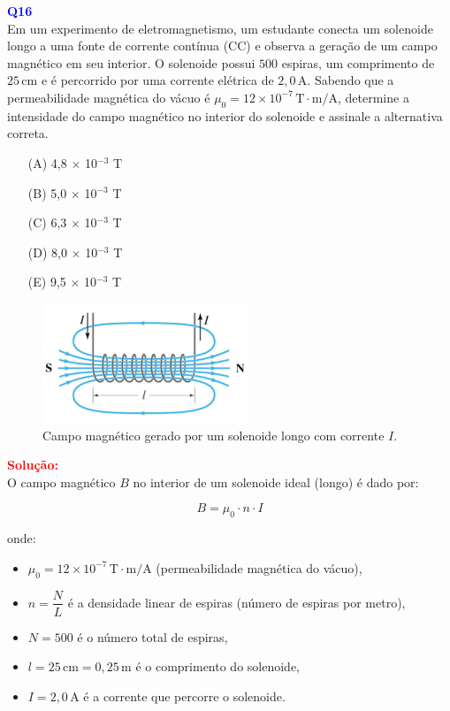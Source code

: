 \documentclass[a4paper,12pt]{article}
\begin{document}
\begin{flushleft}
\textbf{\textcolor{blue}{\Large Q16}}\\
Em um experimento de eletromagnetismo, um estudante conecta um solenoide longo 
a uma fonte de corrente contínua (CC) e observa a geração de um campo magnético 
em seu interior. O solenoide possui \( 500 \) espiras, um comprimento de \( 25\,\text{cm} \) 
e é percorrido por uma corrente elétrica de \( 2{,}0\,\text{A} \). Sabendo que a 
permeabilidade magnética do vácuo é \( \mu_0 = 12 \times 10^{-7}\,\text{T} \cdot \text{m/A} \), 
determine a intensidade do campo magnético no interior do solenoide e assinale a alternativa correta.

\begin{itemize}
\item[(A)] 4,8 $\times$ 10$^{-3}$ T
\item[(B)] 5,0 $\times$ 10$^{-3}$ T
\item[(C)] 6,3 $\times$ 10$^{-3}$ T
\item[(D)] 8,0 $\times$ 10$^{-3}$ T
\item[(E)] 9,5 $\times$ 10$^{-3}$ T
\end{itemize}

\vspace{0.5cm}

\begin{center}
\begin{figure}[h!]
    \centering
    \includegraphics[width=0.55\textwidth]{figures/solenoide.png}
    \caption{Campo magnético gerado por um solenoide longo com corrente \( I \).}
\end{figure}
\end{center}

\textcolor{red}{\textbf{Solução:}}\\

\colorbox{green!20}{O campo magnético \( B \) no interior de um solenoide ideal (longo) é dado por:}

\[
\boxed{
B = \mu_0 \cdot n \cdot I
}
\]

onde:
\begin{itemize}
    \item \( \mu_0 = 12 \times 10^{-7}\,\text{T} \cdot \text{m/A} \) (permeabilidade magnética do vácuo),
    \item \( n = \dfrac{N}{L} \) é a densidade linear de espiras (número de espiras por metro),
    \item \( N = 500 \) é o número total de espiras,
    \item \( l = 25\,\text{cm} = 0{,}25\,\text{m} \) é o comprimento do solenoide,
    \item \( I = 2{,}0\,\text{A} \) é a corrente que percorre o solenoide.
\end{itemize}


\end{flushleft}
\end{document}
